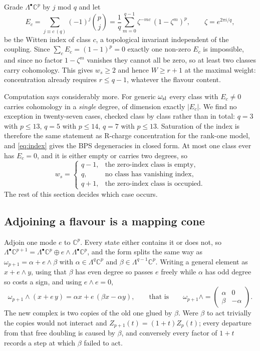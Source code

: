 \documentclass[10pt]{article}
\begin{document}
Grade $\Lambda^\bullet\mathbb C^p$ by $j$ mod $q$ and let
\begin{equation}
E_c=\sum_{j\equiv c\ (q)}(-1)^j\binom pj=\frac1q\sum_{m=0}^{q-1}\zeta^{-mc}\,(1-\zeta^m)^p ,
\qquad \zeta=e^{2\pi i/q},
\label{eq:index}
\end{equation}
be the Witten index of class $c$, a topological invariant independent of the coupling. Since
$\sum_cE_c=(1-1)^p=0$ exactly one non-zero $E_c$ is impossible, and since no factor $1-\zeta^m$ vanishes they
cannot all be zero, so at least two classes carry cohomology. This gives $w_s\ge2$ and hence $W\ge r+1$ at the
maximal weight: concentration already requires $r\le q-1$, whatever the flavour content.

Computation says considerably more. For generic $\omega_{\rm sl}$ every class with $E_c\ne0$ carries cohomology
in a \emph{single} degree, of dimension exactly $|E_c|$. We find no exception in twenty-seven cases, checked
class by class rather than in total: $q=3$ with $p\le13$, $q=5$ with $p\le14$, $q=7$ with $p\le13$. Saturation
of the index is therefore the same statement as R-charge concentration for the rank-one model, and
\eqref{eq:index} gives the BPS degeneracies in closed form. At most one class ever has $E_c=0$, and it is either
empty or carries two degrees, so
\begin{equation}
w_s=\begin{cases} q-1,&\text{the zero-index class is empty},\\[1pt]
q,&\text{no class has vanishing index},\\[1pt]
q+1,&\text{the zero-index class is occupied}.\end{cases}
\label{eq:trichotomy}
\end{equation}
The rest of this section decides which case occurs.

\subsection{Adjoining a flavour is a mapping cone}

Adjoin one mode $e$ to $\mathbb C^p$. Every state either contains it or does not, so
$\Lambda^\bullet\mathbb C^{p+1}=\Lambda^\bullet\mathbb C^p\oplus e\wedge\Lambda^\bullet\mathbb C^p$, and the form
splits the same way as
$\omega_{p+1}=\alpha+e\wedge\beta$ with $\alpha\in\Lambda^q\mathbb C^p$ and $\beta\in\Lambda^{q-1}\mathbb C^p$.
Writing a general element as $x+e\wedge y$, using that $\beta$ has even degree so passes $e$ freely while
$\alpha$ has odd degree so costs a sign, and using $e\wedge e=0$,
\begin{equation}
\omega_{p+1}\wedge(x+e\,y)=\alpha x+e\,(\beta x-\alpha y),\qquad\text{that is}\qquad
\omega_{p+1}\wedge=\begin{pmatrix}\alpha&0\\[2pt]\beta&-\alpha\end{pmatrix}.
\label{eq:cone}
\end{equation}
The new complex is two copies of the old one glued by $\beta$. Were $\beta$ to act trivially the copies would
not interact and $Z_{p+1}(t)=(1+t)Z_p(t)$; every departure from that free doubling is caused by $\beta$, and
conversely every factor of $1+t$ records a step at which $\beta$ failed to act.
\end{document}
